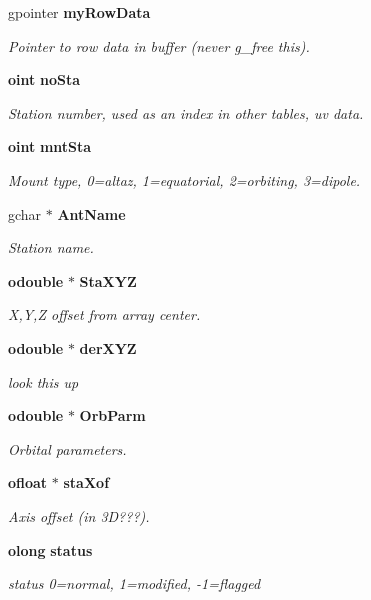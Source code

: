 \begin{CompactItemize}
gpointer {\bf my\-Row\-Data}
\begin{CompactList}\small\item\em Pointer to row data in buffer (never g\_\-free this). \item\end{CompactList}\item 
{\bf oint} {\bf no\-Sta}
\begin{CompactList}\small\item\em Station number, used as an index in other tables, uv data. \item\end{CompactList}\item 
{\bf oint} {\bf mnt\-Sta}
\begin{CompactList}\small\item\em Mount type, 0=altaz, 1=equatorial, 2=orbiting, 3=dipole. \item\end{CompactList}\item 
gchar $\ast$ {\bf Ant\-Name}
\begin{CompactList}\small\item\em Station name. \item\end{CompactList}\item 
{\bf odouble} $\ast$ {\bf Sta\-XYZ}
\begin{CompactList}\small\item\em X,Y,Z offset from array center. \item\end{CompactList}\item 
{\bf odouble} $\ast$ {\bf der\-XYZ}
\begin{CompactList}\small\item\em look this up \item\end{CompactList}\item 
{\bf odouble} $\ast$ {\bf Orb\-Parm}
\begin{CompactList}\small\item\em Orbital parameters. \item\end{CompactList}\item 
{\bf ofloat} $\ast$ {\bf sta\-Xof}
\begin{CompactList}\small\item\em Axis offset (in 3D???). \item\end{CompactList}\item 
{\bf olong} {\bf status}
\begin{CompactList}\small\item\em status 0=normal, 1=modified, -1=flagged \item\end{CompactList}\end{CompactItemize}


